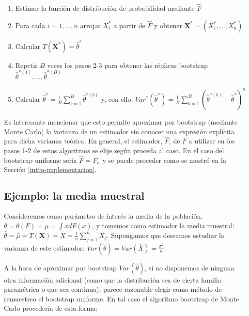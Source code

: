 \documentclass[
]{book}
\renewcommand{\mathbf}[1]{\symbf{#1}}
\theoremstyle{break}
\theoremstyle{nonumberplain}
\begin{document}
\begin{enumerate}
\def\labelenumi{\arabic{enumi}.}
\item
  Estimar la función de distribución de probabilidad mediante \(\hat{
  F}\)
\item
  Para cada \(i=1,\ldots ,n\) arrojar \(X_i^{\ast}\) a partir de
  \(\hat{F}\) y obtener
  \(\mathbf{X}^{\ast}=\left( X_1^{\ast}, \ldots, X_n^{\ast} \right)\)
\item
  Calcular
  \(T\left( \mathbf{X}^{\ast} \right) = \hat{\theta}^{\ast}\)
\item
  Repetir \(B\) veces los pasos 2-3 para obtener las réplicas bootstrap
  \(\hat{\theta}^{\ast (1)}, \ldots, \hat{\theta}^{\ast(B)}\)
\item
  Calcular
  \(\overline{\hat{\theta}^{\ast}}=\frac{1}{B}\sum_{b=1}^{B}\hat{
  \theta}^{\ast (b)}\) y, con ello,
  \(Var^{\ast}\left( \hat{\theta}^{\ast} \right) =\frac{1}{B}\sum_{b=1}^{B}\left( \hat{\theta}^{\ast \left(b \right)}-\overline{\hat{\theta}^{\ast}} \right)^2\)
\end{enumerate}

Es interesante mencionar que esto permite aproximar por bootstrap
(mediante Monte Carlo) la varianza de un estimador sin conocer una
expresión explícita para dicha varianza teórica.
En general, el estimador, \(\hat{F}\), de \(F\) a utilizar en los pasos 1-2
de estos algoritmos se elije según proceda al caso. En el caso del
bootstrap uniforme sería \(\hat{F}=F_n\) y se puede proceder
como se mostró en la Sección \ref{intro-implementacion}.

\subsection{Ejemplo: la media muestral}\label{ejemplo-la-media-muestral}

Consideremos como parámetro de interés la media de la población,
\(\theta =\theta \left( F \right) =\mu =\int xdF\left( x \right)\), y
tomemos como estimador la media muestral:
\(\hat{\theta}=\hat{\mu}=T\left(
\mathbf{X} \right) =\bar{X}=\frac{1}{n}\sum_{j=1}^{n}X_j\).
Supongamos que deseamos estudiar la varianza de este estimador:
\(Var\left(
\hat{\theta} \right) =Var\left( \bar{X} \right) =\frac{\sigma^2}{n}\).

A la hora de aproximar por bootstrap \(Var\left( \hat{\theta} \right)\),
si no disponemos de ninguna otra información adicional (como que la
distribución sea de cierta familia paramétrica o que sea continua),
parece razonable elegir como método de remuestreo el bootstrap uniforme.
En tal caso el algoritmo bootstrap de Monte Carlo procedería de esta
forma:
\end{document}
